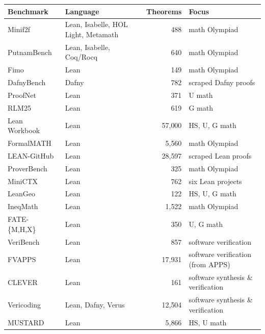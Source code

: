 \begin{table}[h]
\centering
\small
\setlength{\tabcolsep}{4pt}
\renewcommand{\arraystretch}{1.05}
\begin{tabularx}{\textwidth}{@{}
    >{\raggedright\arraybackslash}p{3.3cm}
    l
    r
    >{\raggedright\arraybackslash}X@{}}
\textbf{Benchmark} & \textbf{Language} & \textbf{Theorems} & \textbf{Focus} \\
\midrule
Minif2f~\cite{zheng2021minif2f}
  & Lean, Isabelle, HOL Light, Metamath & 488 & math Olympiad \\
PutnamBench~\cite{tsoukalas2024putnambench}
  & Lean, Isabelle, Coq/Rocq & 640 & math Olympiad \\
Fimo~\cite{liu2023fimo}
  & Lean & 149 & math Olympiad \\
DafnyBench~\cite{loughridge2024dafnybench}
  & Dafny & 782 & scraped Dafny proofs \\
ProofNet~\cite{azerbayev2023proofnet}
  & Lean & 371 & U math \\
RLM25~\cite{poiroux2025reliable}
  & Lean & 619 & G math \\
Lean Workbook~\cite{ying2024lean}
  & Lean & 57{,}000 & HS, U, G math \\
FormalMATH~\cite{yu2025formalmath}
  & Lean & 5{,}560 & math Olympiad \\
LEAN-GitHub~\cite{wu2024lean}
  & Lean & 28{,}597 & scraped Lean proofs \\
ProverBench~\cite{ren2025deepseek}
  & Lean & 325 & math Olympiad \\
MiniCTX~\cite{hu2024minictx}
  & Lean & 762 & six Lean projects \\
LeanGeo~\cite{leangeo}
  & Lean & 122 & HS, U, G math \\
IneqMath~\cite{lu2025solving}
  & Lean & 1{,}522 & math Olympiad \\
FATE-\{M,H,X\}~\cite{jiang2025fate}
  & Lean & 350 & U, G math \\
VeriBench~\cite{barkallah2025veribench}
  & Lean & 857 & software verification \\
FVAPPS~\cite{dougherty2025proving}
  & Lean & 17{,}931  & software verification (from APPS) \\
CLEVER~\cite{thakur2025clever}
  & Lean & 161 & software synthesis \& verification \\
Vericoding~\cite{bursuc2025benchmark}
  & Lean, Dafny, Verus & 12{,}504 & software synthesis \& verification \\
MUSTARD~\cite{huang2024mustard}
  & Lean & 5{,}866 & HS, U math \\

\end{tabularx}
\end{table}
